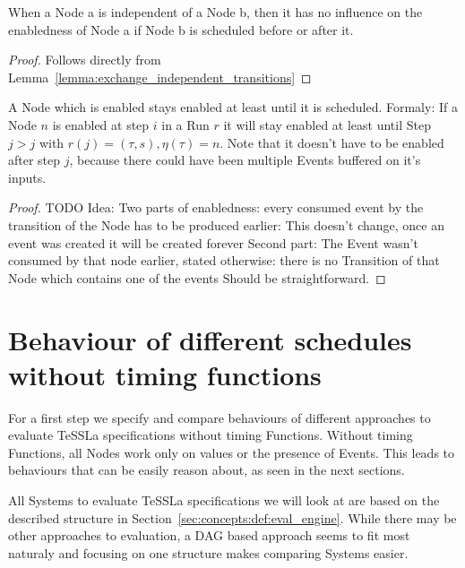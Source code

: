 \begin{lemma}[name = Influence of independent Nodes]\label{lemma:independent_nodes}
  When a Node a is independent of a Node b, then it has no influence on the enabledness of Node a if Node b is scheduled before or after it.
\end{lemma}

\begin{proof}
  Follows directly from Lemma~\ref{lemma:exchange_independent_transitions}
\end{proof}

\begin{lemma}[name = Duration of Enabledness]\label{lemma:enabled_till_scheduled}
  A Node which is enabled stays enabled at least until it is scheduled.
  Formaly: If a Node \(n\) is enabled at step \(i\) in a Run \(r\) it will stay enabled at least until Step \(j > j\) with \(r(j) = (\tau,s), \eta(\tau) = n\).
  Note that it doesn't have to be enabled after step \(j\), because there could have been multiple Events buffered on it's inputs.
\end{lemma}

\begin{proof}
TODO Idea: Two parts of enabledness: every consumed event by the transition of the Node has to be produced earlier: This doesn't change, once an event was created it will be created forever
Second part: The Event wasn't consumed by that node earlier, stated otherwise: there is no Transition of that Node which contains one of the events
Should be straightforward.
\end{proof}


\section{Behaviour of different schedules without timing functions}
\label{sec:concepts:behaviour_without_timing}

For a first step we specify and compare behaviours of different approaches to evaluate TeSSLa specifications without timing Functions.
Without timing Functions, all Nodes work only on values or the presence of Events.
This leads to behaviours that can be easily reason about, as seen in the next sections.

All Systems to evaluate TeSSLa specifications we will look at are based on the described structure in Section~\ref{sec:concepts:def:eval_engine}.
While there may be other approaches to evaluation, a DAG based approach seems to fit most naturaly and focusing on one structure makes comparing Systems easier.

